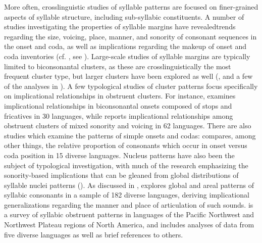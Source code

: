   More often, crosslinguistic studies of syllable patterns are focused on finer-grain\-ed aspects of syllable structure, including sub-syllabic constituents. A number of studies investigating the properties of syllable margins have revealed\linebreak trends regarding the size, voicing, place, manner, and sonority of consonant sequences in the onset and coda, as well as implications regarding the makeup of onset and coda inventories (cf. \citealt{Greenberg19651978}, see ). Large-scale studies of syllable margins are typically limited to biconsonantal clusters, as these are crosslinguistically the most frequent cluster type, but larger clusters have been explored as well (\citealt{VanDam2004}, and a few of the analyses in \citealt{Greenberg19651978}). A few typological studies of cluster patterns focus specifically on implicational relationships in obstruent clusters. For instance, \citet{Morelli1999,Morelli2003} examines implicational relationships in biconsonantal onsets composed of stops and fricatives in 30 languages, while \citet{Kreitman2008} reports implicational relationships among obstruent clusters of mixed sonority and voicing in 62 languages. There are also studies which examine the patterns of simple onsets and codas: \citet{Rousset2004} compares, among other things, the relative proportion of consonants which occur in onset versus coda position in 15 diverse languages. Nucleus patterns have also been the subject of typological investigation, with much of the research emphasizing the sonority-based implications that can be gleaned from global distributions of syllable nuclei patterns (\citealt{Blevins1995,Zec2007}). As discussed in , \citet{Bell1978a} explores global and areal patterns of syllabic consonants in a sample of 182 diverse languages, deriving implicational generalizations regarding the manner and place of articulation of such sounds. \citet{Hoard1978} is a survey of syllabic obstruent patterns in languages of the Pacific Northwest and Northwest Plateau regions of North America, and includes analyses of data from five diverse languages as well as brief references to others.

